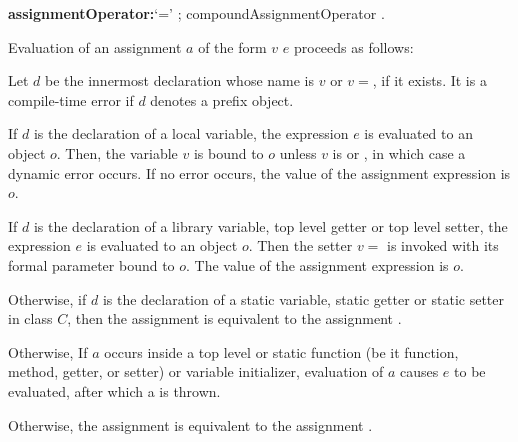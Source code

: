 \documentclass{article}
\begin{document}
\begin{grammar}
{\bf assignmentOperator:}`=' ;
  compoundAssignmentOperator
  .
\end{grammar}

\LMHash{}
Evaluation of an assignment $a$ of the form $v$ \code{=} $e$ proceeds as follows:



\LMHash{}
Let $d$ be the innermost declaration whose name is $v$ or $v=$, if it exists.
It is a compile-time error if $d$ denotes a prefix object.

\LMHash{}
If $d$ is the declaration of a local variable, the expression $e$ is evaluated to an object $o$.
Then, the variable $v$ is bound to $o$ unless $v$ is \FINAL{} or \CONST{}, in which case a dynamic error occurs.
If no error occurs, the value of the assignment expression is $o$.


\LMHash{}
If $d$ is the declaration of a library variable, top level getter or top level setter, the expression $e$ is evaluated to an object $o$.
Then the setter $v=$ is invoked with its formal parameter bound to $o$.
The value of the assignment expression is $o$.

\LMHash{}
Otherwise, if $d$ is the declaration of a static variable, static getter or static setter in class $C$, then the assignment is equivalent to the assignment .

\LMHash{}
Otherwise, If $a$ occurs inside a top level or static function (be it function, method, getter, or setter) or variable initializer, evaluation of $a$ causes $e$ to be evaluated, after which a  is thrown.

\LMHash{}
Otherwise, the assignment is equivalent to the assignment .
\end{document}
